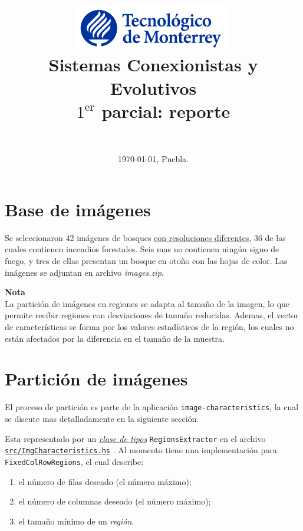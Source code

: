 \documentclass{article}
\title{ \includegraphics[scale=0.6, right]{itesm_logo}
	    \\[4em] 
        Sistemas Conexionistas y Evolutivos
        \\[2em]
        $1^\text{er}$ parcial: reporte %
        \\[1em]
        }
\author{ \vspace*{\fill} \red{ Personal Data} \qquad\small \red{Axxxxxxxx} \\[1em] }
\date{ \vspace*{\fill} \today, Puebla.}
\newcommand\refcode[2]{ \href{#1}{\texttt{#2}} }
\newenvironment{note}
    {\begin{mdframed}[leftmargin=1cm, 
                 skipabove=1em,
                 skipbelow=1em,
                 rightline=false, 
                 topline=false,
                 bottomline=false,
                 linewidth=2pt]
        \textbf{Nota}\\}
    {\end{mdframed}}
\begin{document}

\maketitle
\newpage

\def\ImgCharRoot{run:./docs/image-characteristics}
\def\ImgCharacteristics{\ImgCharRoot/ImgCharacteristics.html}
\def\Friday{\ImgCharRoot/ImgCharacteristics-Friday.html}
\def\Extractors{\ImgCharRoot/ImgCharacteristics-Friday-Extractors.html}
\def\ExtractorBuilder{\ImgCharRoot/ImgCharacteristics-ExtractorBuilder.html}
\def\GTK{\ImgCharRoot/ImgCharacteristics-GTK.html}
\def\Weka{\ImgCharRoot/ImgCharacteristics-Weka.html}

\def\ExecAll{run:./docs/image-characteristics/img-chv_descriptive-stats_all/src/Main.html}

\def\Nat{run:./docs/Nat/frames.html}
\def\WekaData{run:./docs/WekaData/frames.html}

\section{Base de imágenes}

Se seleccionaron 42 imágenes de bosques \underline{con resoluciones diferentes}, 36 de las cuales contienen incendios forestales. Seis mas no contienen ningún signo de fuego, y tres de ellas presentan un bosque en otoño con las hojas de color. Las imágenes se adjuntan en archivo \textit{images.zip}.

\begin{note}
La partición de imágenes en regiones se adapta al tamaño de la imagen, lo que permite recibir regiones con desviaciones de tamaño reducidas. Ademas, el vector de características se forma por los valores estadísticos de la región, los cuales no están afectados por la diferencia en el tamaño de la muestra.
\end{note}


\section{Partición de imágenes}

El proceso de partición es parte de la aplicación \verb|image-characteristics|, la cual se discute mas detalladamente en la siguiente sección.

Esta representado por un \href{http://learnyouahaskell.com/types-and-typeclasses}{\emph{clase de tipos}} \verb|RegionsExtractor| en el archivo 
\refcode{\ImgCharacteristics}{src/ImgCharacteristics.hs}.
Al momento tiene una implementación para \verb|FixedColRowRegions|, el cual describe:
\begin{enumerate}
\item el número de filas deseado (el número máximo);
\item el número de columnas deseado (el número máximo);
\item el tamaño mínimo de un \emph{región}.
\end{enumerate}
\end{document}

